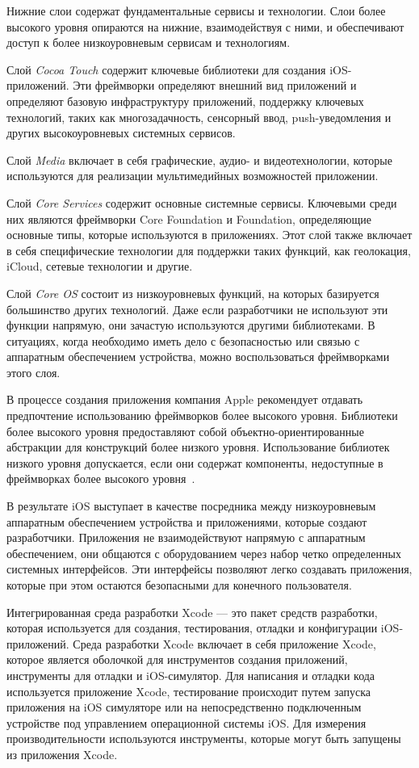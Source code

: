 Нижние слои содержат фундаментальные сервисы и технологии.
Слои более высокого уровня опираются на нижние, взаимодействуя с ними,
и обеспечивают доступ к более низкоуровневым сервисам и технологиям.

Слой \textit{Cocoa Touch} содержит ключевые библиотеки для создания iOS-приложений.
Эти фреймворки определяют внешний вид приложений и определяют базовую
инфраструктуру приложений, поддержку ключевых технологий,
таких как многозадачность, сенсорный ввод,
push-уведомления и других высокоуровневых системных сервисов.

Слой \textit{Media} включает в себя графические, аудио- и видеотехнологии,
которые используются для реализации мультимедийных возможностей приложении.

Слой \textit{Core Services} содержит основные системные сервисы. Ключевыми среди
них являются фреймворки Core Foundation и Foundation,
определяющие основные типы, которые используются в приложениях.
Этот слой также включает в себя специфические технологии
для поддержки таких функций, как геолокация, iCloud, сетевые
технологии и другие.

Слой \textit{Core OS} состоит из низкоуровневых функций, на которых базируется
большинство других технологий. Даже если разработчики не используют
эти функции напрямую, они зачастую используются другими библиотеками.
В ситуациях, когда необходимо иметь дело с безопасностью или связью
с аппаратным обеспечением устройства, можно воспользоваться фреймворками этого
слоя.

В процессе создания приложения компания Apple рекомендует отдавать предпочтение
использованию фреймворков более высокого уровня. Библиотеки более высокого
уровня предоставляют собой объектно-ориентированные абстракции
для конструкций более низкого уровня.
Использование библиотек низкого уровня допускается,
если они содержат компоненты, недоступные в фреймворках
более высокого уровня~\cite{ios_core_layers}.

В результате iOS выступает в качестве посредника между низкоуровневым
аппаратным обеспечением устройства и приложениями, которые создают разработчики.
Приложения не взаимодействуют напрямую с аппаратным обеспечением,
они общаются с оборудованием через набор четко определенных системных интерфейсов.
Эти интерфейсы позволяют легко создавать приложения,
которые при этом остаются безопасными для конечного пользователя.


Интегрированная среда разработки Xcode --- это пакет средств разработки,
которая используется для создания,
тестирования, отладки и конфигурации iOS-приложений. Среда разработки Xcode
включает в себя приложение Xcode, которое является оболочкой для инструментов
создания приложений, инструменты для отладки и iOS-симулятор.
Для написания и отладки кода используется приложение Xcode,
тестирование происходит путем запуска приложения на iOS симуляторе
или на непосредственно подключенным устройстве под управлением операционной системы iOS.
Для измерения производительности используются инструменты,
которые могут быть запущены из приложения Xcode.

